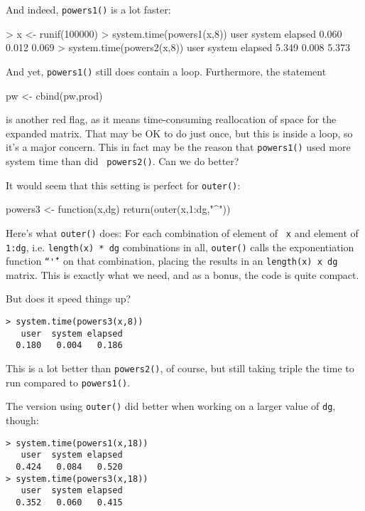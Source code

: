\noindent
And indeed, {\tt powers1()} is a lot faster:

\begin{Code}
> x <- runif(100000)
> system.time(powers1(x,8))
   user  system elapsed 
  0.060   0.012   0.069 
> system.time(powers2(x,8))
   user  system elapsed 
  5.349   0.008   5.373 
\end{Code}

And yet, {\tt powers1()} still does contain a loop.  Furthermore, the
statement

\begin{Code}
pw <- cbind(pw,prod)
\end{Code}

\noindent
is another red flag, as it means time-consuming reallocation of space 
for the expanded matrix.  That may be OK to do just once, but this is 
inside a loop, so it's a major concern.  This in fact may be the 
reason that {\tt powers1()} used more system time than did {\tt 
powers2()}.  Can we do better?  

It would seem that this setting is perfect for {\tt outer()}:

\begin{Code}
powers3 <- function(x,dg) return(outer(x,1:dg,"^"))
\end{Code}

\noindent
Here's what {\tt outer()} does:  For each combination of element of {\tt
x} and element of {\tt 1:dg}, i.e. {\tt length(x) * dg} combinations in
all, {\tt outer()} calls the exponentiation function {\tt ``\^''} on that
combination, placing the results in an {\tt length(x) x dg} matrix.
This is exactly what we need, and as a bonus, the code is quite compact.

But does it speed things up?

\begin{Verbatim}
> system.time(powers3(x,8))
   user  system elapsed 
  0.180   0.004   0.186 
\end{Verbatim}

\noindent
This is a lot better than {\tt powers2()}, of course, but still taking
triple the time to run compared to {\tt powers1()}.

The version using {\tt outer()} did better when working on a larger
value of {\tt dg}, though:

\begin{Verbatim}
> system.time(powers1(x,18))
   user  system elapsed 
  0.424   0.084   0.520 
> system.time(powers3(x,18))
   user  system elapsed 
  0.352   0.060   0.415 
\end{Verbatim}

